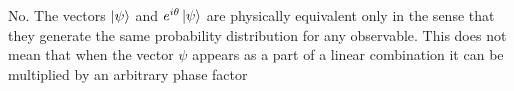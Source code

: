 \documentclass[../../../main.tex]{subfiles}
\begin{document}
No.
The vectors $\ket{\psi}$ and $e^{i\theta}\ket{\psi}$ are physically equivalent only in the sense that they generate the same probability distribution for any observable.
This does not mean that when the vector $\psi$ appears as a part of a linear combination it can be multiplied by an arbitrary phase factor
\end{document}
